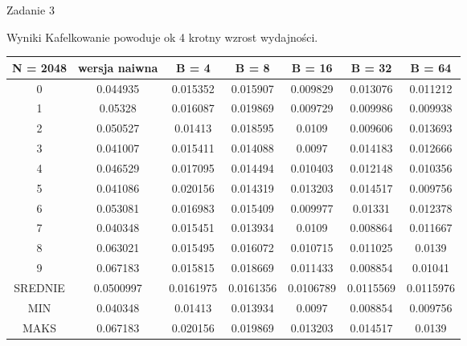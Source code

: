 \documentclass[11pt,wide]{mwart}
\begin{document}
\begin{section}{Zadanie 3}
\begin{subsection}{Wyniki}
Kafelkowanie powoduje ok 4 krotny wzrost wydajności.

\begin{center}
\begin{tabular}{|c|c|c|c|c|c|c|}
\hline
N = 2048 & wersja naiwna & B = 4 & B = 8 & B = 16 & B = 32 & B = 64\\
\hline
0 & 0.044935 & 0.015352 & 0.015907 & 0.009829 & 0.013076 & 0.011212\\
\hline
1 & 0.05328 & 0.016087 & 0.019869 & 0.009729 & 0.009986 & 0.009938\\
\hline
2 & 0.050527 & 0.01413 & 0.018595 & 0.0109 & 0.009606 & 0.013693\\
\hline
3 & 0.041007 & 0.015411 & 0.014088 & 0.0097 & 0.014183 & 0.012666\\
\hline
4 & 0.046529 & 0.017095 & 0.014494 & 0.010403 & 0.012148 & 0.010356\\
\hline
5 & 0.041086 & 0.020156 & 0.014319 & 0.013203 & 0.014517 & 0.009756\\
\hline
6 & 0.053081 & 0.016983 & 0.015409 & 0.009977 & 0.01331 & 0.012378\\
\hline
7 & 0.040348 & 0.015451 & 0.013934 & 0.0109 & 0.008864 & 0.011667\\
\hline
8 & 0.063021 & 0.015495 & 0.016072 & 0.010715 & 0.011025 & 0.0139\\
\hline
9 & 0.067183 & 0.015815 & 0.018669 & 0.011433 & 0.008854 & 0.01041\\
\hline
SREDNIE & 0.0500997 & 0.0161975 & 0.0161356 & 0.0106789 & 0.0115569 & 0.0115976\\
\hline
MIN & 0.040348 & 0.01413 & 0.013934 & 0.0097 & 0.008854 & 0.009756\\
\hline
MAKS & 0.067183 & 0.020156 & 0.019869 & 0.013203 & 0.014517 & 0.0139\\
\hline
\end{tabular}
\end{center}


\end{subsection}
\end{section}
\end{document}
